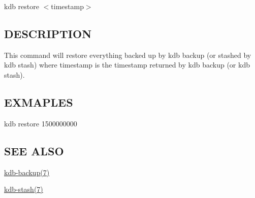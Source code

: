 {\ttfamily kdb restore $<$timestamp$>$}

\subsection*{D\+E\+S\+C\+R\+I\+P\+T\+I\+ON}

This command will restore everything backed up by {\ttfamily kdb backup} (or stashed by {\ttfamily kdb stash}) where {\ttfamily timestamp} is the timestamp returned by {\ttfamily kdb backup} (or {\ttfamily kdb stash}).

\subsection*{E\+X\+M\+A\+P\+L\+ES}


\begin{DoxyCode}
kdb restore 1500000000
\end{DoxyCode}


\subsection*{S\+EE A\+L\+SO}


\begin{DoxyItemize}
\item \hyperlink{md_doc_help_kdb-backup_doc_help_kdb-backup_md}{kdb-\/backup(7)}
\item \hyperlink{md_doc_help_kdb-stash_doc_help_kdb-stash_md}{kdb-\/stash(7)} 
\end{DoxyItemize}